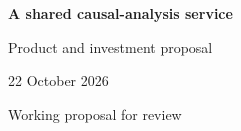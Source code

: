 \documentclass[11pt,a4paper]{article}
\begin{document}
\begin{center}{\LARGE\bfseries A shared causal-analysis service\par}\vspace{3mm}
{\large Product and investment proposal\par}\vspace{2mm}
22 October 2026\par Working proposal for review
\end{center}

\clearpage


\end{document}
